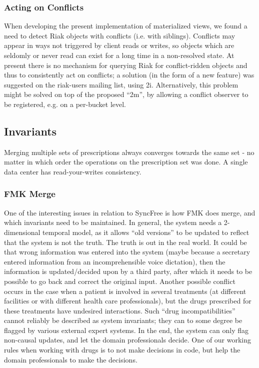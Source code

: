 \documentclass[11pt,a4paper]{report}
\begin{document}
\subsubsection{Acting on Conflicts}
When developing the present implementation of materialized views, we found a need to detect Riak objects with conflicts (i.e. with siblings). Conflicts may appear in ways not triggered by client reads or writes, so objects which are seldomly or never read can exist for a long time in a non-resolved state. At present there is no mechanism for querying Riak for conflict-ridden objects and thus to consistently act on conflicts; a solution (in the form of a new feature) was suggested on the riak-users mailing list, using 2i.
Alternatively, this problem might be solved on top of the proposed ``2m'', by allowing a conflict observer to be registered, e.g. on a per-bucket level.

\subsection{Invariants}
Merging multiple sets of prescriptions always converges towards the same set - no matter in which order the operations on the prescription set was done.
A single data center has read-your-writes consistency.
\subsubsection{FMK Merge}
One of the interesting issues in relation to SyncFree is how FMK does merge, and which invariants need to be maintained.
In general, the system needs a 2-dimensional temporal model, as it allows ``old versions'' to be updated to reflect that the system is not the truth. The truth is out in the real world. It could be that wrong information was entered into the system (maybe because a secretary entered information from an incomprehensible voice dictation), then the information is updated/decided upon by a third party, after which it needs to be possible to go back and correct the original input. Another possible conflict occurs in the case when a patient is involved in several treatments (at different facilities or with different health care professionals), but the drugs prescribed for these treatments have undesired interactions. Such ``drug incompatibilities'' cannot reliably be described as system invariants; they can to some degree be flagged by various external expert systems. In the end, the system can only flag non-causal updates, and let the domain professionals decide. One of our working rules when working with drugs is to not make decisions in code, but help the domain professionals to make the decisions.
\end{document}
